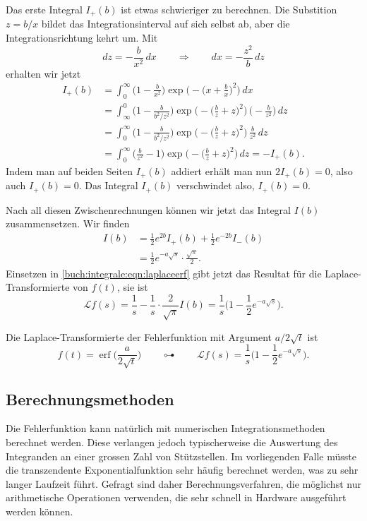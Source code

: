 Das erste Integral $I_+(b)$ ist etwas schwieriger zu berechnen.
Die Substition $z=b/x$ bildet das Integrationsinterval auf sich selbst ab,
aber die Integrationsrichtung kehrt um.
Mit
\[
dz = -\frac{b}{x^2}\,dx
\qquad\Rightarrow\qquad
dx = -\frac{z^2}{b}\,dz
\]
erhalten wir jetzt
\begin{align*}
I_+(b)
&=
\int_0^\infty
\biggl(1-\frac{b}{x^2}\biggr)
\exp\biggl(-\biggl(x+\frac{b}{x}\biggr)^2\biggr)\,dx
\\
&=
\int_{\infty}^0
\biggl(1-\frac{b}{b^2/z^2}\biggr)
\exp\biggl(-\biggl(\frac{b}{z}+z\biggr)^2\biggr)\,
\biggl(-\frac{b}{z^2}\biggr)\,dz
\\
&=
\int_{0}^{\infty}
\biggl(1-\frac{b}{b^2/z^2}\biggr)
\exp\biggl(-\biggl(\frac{b}{z}+z\biggr)^2\biggr)\,
\frac{b}{z^2}\,dz
\\
&=
\int_{0}^{\infty}
\biggl(\frac{b}{z^2}-1\biggr)
\exp\biggl(-\biggl(\frac{b}{z}+z\biggr)^2\biggr)\,
dz
=
-I_+(b).
\end{align*}
Indem man auf beiden Seiten $I_+(b)$ addiert erhält man nun $2I_+(b)=0$,
also auch $I_+(b)=0$.
Das Integral $I_+(b)$ verschwindet also, $I_+(b)=0$.

Nach all diesen Zwischenrechnungen können wir jetzt das Integral $I(b)$
zusammensetzen.
Wir finden
\begin{align*}
I(b)
&=
\frac12e^{2b} I_+(b) +\frac12e^{-2b} I_-(b)
\\
&=
\frac12e^{-a\sqrt{s}}\cdot \frac{\sqrt{\pi}}{2}.
\end{align*}
Einsetzen in \eqref{buch:integrale:eqn:laplaceerf} gibt jetzt das
Resultat für die Laplace-Transformierte von $f(t)$, sie ist
\[
\mathscr{L}f(s)
=
\frac1s - \frac1s\cdot\frac{2}{\sqrt{\pi}} I(b)
=
\frac1s\biggl(1-\frac12e^{-a\sqrt{s}} \biggr).
\]

\begin{satz}
%
Die Laplace-Transformierte der Fehlerfunktion mit Argument
$a/2\sqrt{t}$ ist
\begin{equation}
f(t) = \operatorname{erf}\biggl(\frac{a}{2\sqrt{t}}\biggr)
\qquad\multimapdotbothA\qquad
\mathscr{L}f(s)
=
\frac1s\biggl(1-\frac12e^{-a\sqrt{s}}\biggr).
\end{equation}
\end{satz}




\subsection{Berechnungsmethoden}
Die Fehlerfunktion kann natürlich mit numerischen Integrationsmethoden
berechnet werden.
Diese verlangen jedoch typischerweise die Auswertung des Integranden
an einer grossen Zahl von Stützstellen.
Im vorliegenden Falle müsste die transzendente Exponentialfunktion
sehr häufig berechnet werden, was zu sehr langer Laufzeit führt.
Gefragt sind daher Berechnungsverfahren, die möglichst nur arithmetische
Operationen verwenden, die sehr schnell in Hardware ausgeführt werden
können.

